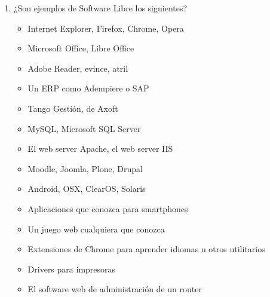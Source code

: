 \begin{enumerate}
	\item ¿Son ejemplos de Software Libre los siguientes?
\begin{itemize}
	\item Internet Explorer, Firefox, Chrome, Opera
	\item Microsoft Office, Libre Office
	\item Adobe Reader, evince, atril
	\item Un ERP como Adempiere o SAP
	\item Tango Gestión, de Axoft
	\item MySQL, Microsoft SQL Server
	\item El web server Apache, el web server IIS
	\item Moodle, Joomla, Plone, Drupal
	\item Android, OSX, ClearOS, Solaris
	\item Aplicaciones que conozca para smartphones 
	\item Un juego web cualquiera que conozca
	\item Extensiones de Chrome para aprender idiomas u otros utilitarios 
	\item Drivers para impresoras
	\item El software web de administración de un router
\end{itemize} 



\end{enumerate}

